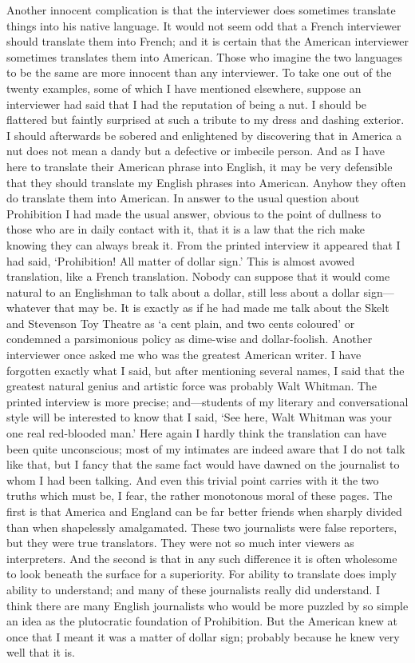 \documentclass{book}
\begin{document}
Another innocent complication is that the interviewer does sometimes translate things into his native language. It would not seem odd that a French interviewer should translate them into French; and it is certain that the American interviewer sometimes translates them into American. Those who imagine the two languages to be the same are more innocent than any interviewer. To take one out of the twenty examples, some of which I have mentioned elsewhere, suppose an interviewer had said that I had the reputation of being a nut. I should be flattered but faintly surprised at such a tribute to my dress and dashing exterior. I should afterwards be sobered and enlightened by discovering that in America a nut does not mean a dandy but a defective or imbecile person. And as I have here to translate their American phrase into English, it may be very defensible that they should translate my English phrases into American. Anyhow they often do translate them into American. In answer to the usual question about Prohibition I had made the usual answer, obvious to the point of dullness to those who are in daily contact with it, that it is a law that the rich make knowing they can always break it. From the printed interview it appeared that I had said, ‘Prohibition! All matter of dollar sign.’ This is almost avowed translation, like a French translation. Nobody can suppose that it would come natural to an Englishman to talk about a dollar, still less about a dollar sign—whatever that may be. It is exactly as if he had made me talk about the Skelt and Stevenson Toy Theatre as ‘a cent plain, and two cents coloured’ or condemned a parsimonious policy as dime-wise and dollar-foolish. Another interviewer once asked me who was the greatest American writer. I have forgotten exactly what I said, but after mentioning several names, I said that the greatest natural genius and artistic force was probably Walt Whitman. The printed interview is more precise; and—students of my literary and conversational style will be interested to know that I said, ‘See here, Walt Whitman was your one real red-blooded man.’ Here again I hardly think the translation can have been quite unconscious; most of my intimates are indeed aware that I do not talk like that, but I fancy that the same fact would have dawned on the journalist to whom I had been talking. And even this trivial point carries with it the two truths which must be, I fear, the rather monotonous moral of these pages. The first is that America and England can be far better friends when sharply divided than when shapelessly amalgamated. These two journalists were false reporters, but they were true translators. They were not so much inter viewers as interpreters. And the second is that in any such difference it is often wholesome to look beneath the surface for a superiority. For ability to translate does imply ability to understand; and many of these journalists really did understand. I think there are many English journalists who would be more puzzled by so simple an idea as the plutocratic foundation of Prohibition. But the American knew at once that I meant it was a matter of dollar sign; probably because he knew very well that it is.
\end{document}
